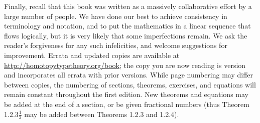 Finally, recall that this book was written as a massively collaborative effort by a large number of people.
We have done our best to achieve consistency in terminology and notation, and to put the mathematics in a linear sequence that flows logically, but it is very likely that some imperfections remain.
We ask the reader's forgiveness for any such infelicities, and welcome suggestions for improvement.
%
Errata and updated copies are available at \url{http://homotopytypetheory.org/book};
the copy you are now reading is version \texttt{\OPTversion}and incorporates all errata with prior versions.
While page numbering may differ between copies, the numbering of sections, theorems, exercises, and equations will remain constant throughout the first edition.
New theorems and equations may be added at the end of a section, or be given fractional numbers (thus Theorem 1.2.3$\frac12$ may be added between Theorems 1.2.3 and 1.2.4).

